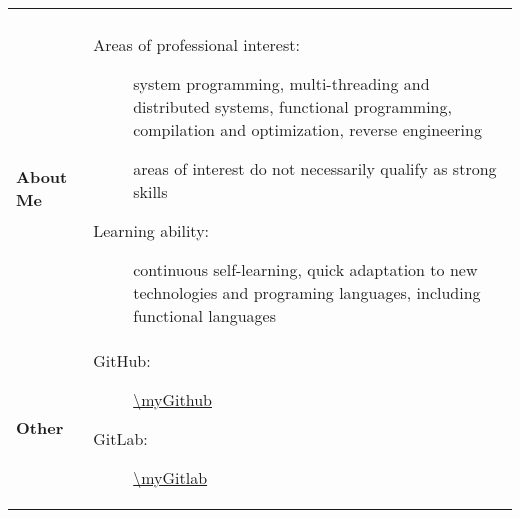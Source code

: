 \documentclass[../../main.tex]{subfiles}
\begin{document}
\begin{tabularx}{\textwidth}{>{\bfseries} p{2.5cm} X}
\begin{description}
            \end{description}\\
        About Me &
            \begin{description}
                \item[Areas of professional interest:] system programming, multi-threading and distributed systems, functional programming, compilation and optimization, reverse engineering
                \item[\ii{Note:}] areas of interest do not necessarily qualify as strong skills
                \item[Learning ability:] continuous self-learning, quick adaptation to new technologies and programing languages, including functional languages
            \end{description}\\
        Other &
            \begin{description}
                \item[GitHub:] \url{\myGithub}
                \item[GitLab:] \url{\myGitlab}
            \end{description}\\
    \end{tabularx}
\end{document}
